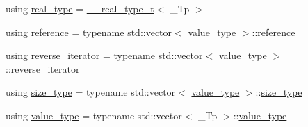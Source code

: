 \begin{DoxyCompactItemize}
\item 
using \hyperlink{class____gnu__cxx_1_1__Polynomial_a656ceaafcb42abd626c253da3284998b}{real\+\_\+type} = \hyperlink{namespace____gnu__cxx_a3f707c0c6f6926cf68b74072733751f7}{\+\_\+\+\_\+real\+\_\+type\+\_\+t}$<$ \+\_\+\+Tp $>$
\item 
using \hyperlink{class____gnu__cxx_1_1__Polynomial_accb3b4df60e4ad82d466173d54ea731a}{reference} = typename std\+::vector$<$ \hyperlink{class____gnu__cxx_1_1__Polynomial_a725563351f50e76084a7a016c06f8a53}{value\+\_\+type} $>$\+::\hyperlink{class____gnu__cxx_1_1__Polynomial_accb3b4df60e4ad82d466173d54ea731a}{reference}
\item 
using \hyperlink{class____gnu__cxx_1_1__Polynomial_aed8f7d97c575d5c34c54170631953415}{reverse\+\_\+iterator} = typename std\+::vector$<$ \hyperlink{class____gnu__cxx_1_1__Polynomial_a725563351f50e76084a7a016c06f8a53}{value\+\_\+type} $>$\+::\hyperlink{class____gnu__cxx_1_1__Polynomial_aed8f7d97c575d5c34c54170631953415}{reverse\+\_\+iterator}
\item 
using \hyperlink{class____gnu__cxx_1_1__Polynomial_a8b25fcfd4acaad0c5c08b649c22da28a}{size\+\_\+type} = typename std\+::vector$<$ \hyperlink{class____gnu__cxx_1_1__Polynomial_a725563351f50e76084a7a016c06f8a53}{value\+\_\+type} $>$\+::\hyperlink{class____gnu__cxx_1_1__Polynomial_a8b25fcfd4acaad0c5c08b649c22da28a}{size\+\_\+type}
\item 
using \hyperlink{class____gnu__cxx_1_1__Polynomial_a725563351f50e76084a7a016c06f8a53}{value\+\_\+type} = typename std\+::vector$<$ \+\_\+\+Tp $>$\+::\hyperlink{class____gnu__cxx_1_1__Polynomial_a725563351f50e76084a7a016c06f8a53}{value\+\_\+type}
\end{DoxyCompactItemize}
